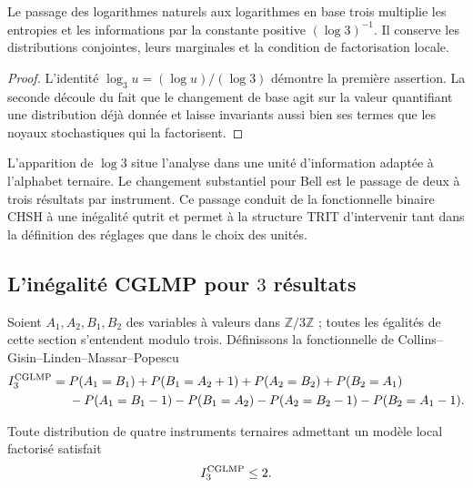 \begin{proposition}
\label{prop:log3-localidad}
Le passage des logarithmes naturels aux logarithmes en base trois multiplie les entropies et les informations par la constante positive \((\log 3)^{-1}\). Il conserve les distributions conjointes, leurs marginales et la condition de factorisation locale.
\end{proposition}

\begin{proof}
L’identité \(\log_3u=(\log u)/(\log 3)\) démontre la première assertion. La seconde découle du fait que le changement de base agit sur la valeur quantifiant une distribution déjà donnée et laisse invariants aussi bien ses termes que les noyaux stochastiques qui la factorisent.
\end{proof}

L’apparition de \(\log 3\) situe l’analyse dans une unité d’information adaptée à l’alphabet ternaire. Le changement substantiel pour Bell est le passage de deux à trois résultats par instrument. Ce passage conduit de la fonctionnelle binaire CHSH à une inégalité qutrit et permet à la structure TRIT d’intervenir tant dans la définition des réglages que dans le choix des unités.

\subsection{L’inégalité CGLMP pour \(3\) résultats}

Soient \(A_1,A_2,B_1,B_2\) des variables à valeurs dans \(\mathbb Z/3\mathbb Z\) ; toutes les égalités de cette section s’entendent modulo trois. Définissons la fonctionnelle de Collins--Gisin--Linden--Massar--Popescu \cite{CGLMP2002}
\begin{align}
 I_3^{\rm CGLMP}={}&P(A_1=B_1)+P(B_1=A_2+1)
 +P(A_2=B_2)+P(B_2=A_1)\notag\\
 &-P(A_1=B_1-1)-P(B_1=A_2)
 -P(A_2=B_2-1)-P(B_2=A_1-1).
 \label{eq:cglmp-tres}
\end{align}

\begin{theorem}
\label{thm:cglmp-local}
Toute distribution de quatre instruments ternaires admettant un modèle local factorisé satisfait
\[
 I_3^{\rm CGLMP}\leq2.
\]
\end{theorem}

